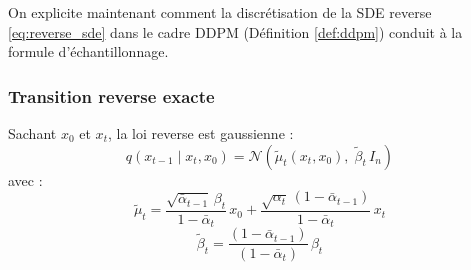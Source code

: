 \documentclass[12pt]{article}
\begin{document}
On explicite maintenant comment la discrétisation de la SDE reverse \eqref{eq:reverse_sde} dans le cadre DDPM (Définition \ref{def:ddpm}) conduit à la formule d'échantillonnage.

\subsubsection{Transition reverse exacte}

\begin{propositionbox}
\label{prop:reverse_exact}
Sachant $x_0$ et $x_t$, la loi reverse est gaussienne :
\begin{equation}
    q(x_{t-1} \mid x_t, x_0) = \mathcal{N}\!\left(\tilde{\mu}_t(x_t, x_0),\; \tilde{\beta}_t\, I_n\right)
    \label{eq:reverse_transition}
\end{equation}
avec :
\begin{equation}
    \boxed{\tilde{\mu}_t = \frac{\sqrt{\bar{\alpha}_{t-1}}\, \beta_t}{1 - \bar{\alpha}_t}\, x_0 + \frac{\sqrt{\alpha_t}\,(1 - \bar{\alpha}_{t-1})}{1 - \bar{\alpha}_t}\, x_t}
    \label{eq:mu_tilde}
\end{equation}
\begin{equation}
    \boxed{\tilde{\beta}_t = \frac{(1 - \bar{\alpha}_{t-1})}{(1 - \bar{\alpha}_t)}\, \beta_t}
    \label{eq:beta_tilde}
\end{equation}
\end{propositionbox}
\end{document}
